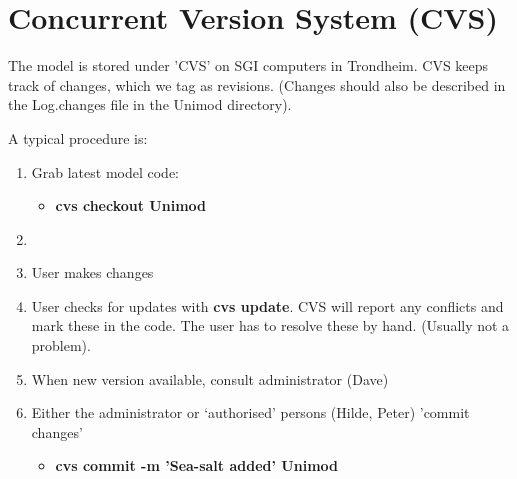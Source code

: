 \chapter{Concurrent Version System (CVS)}


The model is stored under 'CVS' on SGI computers in Trondheim.
CVS keeps track of changes, which we tag as revisions.
(Changes should also be described in the Log.changes file in the Unimod
directory).

A typical procedure is:

\begin{enumerate}

    \item
     Grab latest model code:
     \begin{itemize}
       \item
       {\bf cvs checkout Unimod}
     \end{itemize}
     \item

    \item
     User makes changes
     
    \item
     User checks for updates with {\bf cvs update}. CVS will report
     any conflicts and mark these in the code. The user has to resolve
     these by hand. (Usually not a problem).
     
    \item
     When new version available, consult administrator (Dave)

     \item 
     Either the administrator or `authorised' persons (Hilde, Peter) 'commit changes'
     \begin{itemize}
     \item
     {\bf cvs commit -m 'Sea-salt added'  Unimod}
     \end{itemize}
\end{enumerate}
